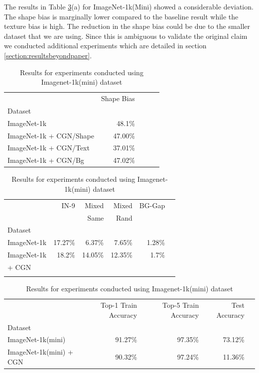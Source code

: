 The results in Table \ref{table:imagenet-experiments}(a) for ImageNet-1k(Mini) showed a considerable deviation. The shape bias is marginally lower compared to the baseline result while the texture bias is high. The reduction in the shape bias could be due to the smaller dataset that we are using. Since this is ambiguous to validate the original claim we conducted additional experiments which are detailed in section \ref{section:resultsbeyondpaper}. 
\begin{table}[h]
\begin{subtable}[c]{0.45\textwidth}
\begin{tabular}{lrrrr}
\toprule
{} & Shape Bias\\
Dataset& \\
\midrule
ImageNet-1k &  48.1\%\\
\midrule
ImageNet-1k + CGN/Shape & 47.00\%\\
ImageNet-1k + CGN/Text & 37.01\%\\
ImageNet-1k + CGN/Bg & 47.02\% \\
\end{tabular}
\caption{Impact on shape bias}
\end{subtable}
\hspace{0.8em}
\begin{subtable}[c]{0.45\textwidth}
\begin{tabular}{lrrrrr}
\toprule
{} & IN-9 & Mixed & Mixed & BG-Gap\\
{} &      & Same & Rand & \\
Dataset & & & & \\
\midrule
ImageNet-1k & 17.27\% & 6.37\% & 7.65\% & 1.28\% \\
ImageNet-1k & 18.2\% & 14.05\% & 12.35\% & 1.7\% \\
+ CGN       &       &       &       & \\
\label{table:imagenet_ood}
\end{tabular}
\caption{Out-of-distribution accuracy for ImageNet variants}
\end{subtable}
\vfill
\begin{subtable}[c]{\textwidth}
\centering
\begin{tabular}{lrrrr}
\toprule
{} & Top-1 Train Accuracy &  Top-5 Train Accuracy & Test Accuracy \\
Dataset & & &\\
\midrule
ImageNet-1k(mini) & 91.27\% & 97.35\% & 73.12\% \\
ImageNet-1k(mini) + CGN & 90.32\% & 97.24\% & 11.36\%
\end{tabular}

\label{table:imagenet-ac}
\caption{Train and Test accuracies for ImageNet-1k(mini) with Resnet-50 backbone}
\end{subtable}
\caption{Results for experiments conducted using Imagenet-1k(mini) dataset}
\label{table:imagenet-experiments}
\end{table}
